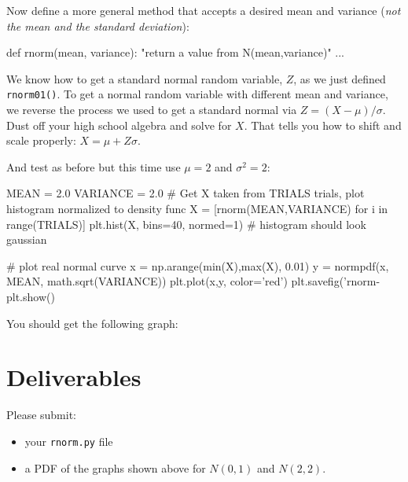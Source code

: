 \begin{fullwidth}
\step Now define a more general method that accepts a desired mean and variance ({\em not the mean and the standard deviation}):

\begin{pyverbatim}
def rnorm(mean, variance):
    "return a value from N(mean,variance)"
    ...
\end{pyverbatim}

\noindent We know how to get a standard normal random variable, $Z$, as we just defined {\tt rnorm01()}. To get a normal random variable with different mean and variance, we reverse the process we used to get a standard normal via $Z = (X-\mu)/\sigma$. Dust off your high school algebra and solve for $X$. That tells you how to shift and scale properly: $X = \mu+ Z\sigma$.

\step And test as before but this time use $\mu=2$ and $\sigma^2 = 2$:

\begin{pyverbatim}
MEAN = 2.0
VARIANCE = 2.0
# Get X taken from TRIALS trials, plot histogram normalized to density func
X = [rnorm(MEAN,VARIANCE) for i in range(TRIALS)]
plt.hist(X, bins=40, normed=1) # histogram should look gaussian

# plot real normal curve
x = np.arange(min(X),max(X), 0.01)
y = normpdf(x, MEAN, math.sqrt(VARIANCE))
plt.plot(x,y, color='red') 
plt.savefig('rnorm-%
plt.show()
\end{pyverbatim}

\noindent You should get the following graph:


\section{Deliverables}

Please submit:

\begin{itemize}
\item your {\tt rnorm.py} file
\item a PDF of the graphs shown above for $N(0,1)$ and $N(2,2)$.
\end{itemize}

\end{fullwidth}


